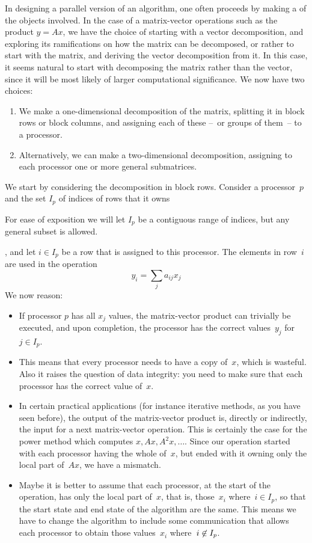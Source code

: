 In designing a parallel version of an algorithm, one often proceeds by
making a  of the objects involved. In
the case of a matrix-vector operations such as the product $y=Ax$, we
have the choice of starting with a vector decomposition, and exploring
its ramifications on how the matrix can be decomposed, or rather to
start with the matrix, and deriving the vector decomposition from it.
In this case, it seems natural to start with decomposing the matrix
rather than the vector, since it will be most likely of larger
computational significance. We now have two choices:
\begin{enumerate}
\item We make a one-dimensional decomposition of the matrix, splitting
  it in block rows or block columns, and assigning each of these --~or
  groups of them~-- to a processor.
\item Alternatively, we can make a two-dimensional decomposition,
  assigning to each processor one or more general submatrices.
\end{enumerate}

We start by considering the decomposition in block rows. Consider
a processor~$p$ and the set $I_p$ of indices of rows that it
owns
\begin{footnoteenv}
  {For ease of exposition we will let $I_p$ be a contiguous
    range of indices, but any general subset is allowed.}
\end{footnoteenv}%
, and
let $i\in I_p$ be a row that is assigned to this processor. 
The elements in
row~$i$ are used in the operation
\[ y_i=\sum_ja_{ij}x_j \]
We now reason:
\begin{itemize}
\item If processor $p$ has all $x_j$ values, the matrix-vector product
  can trivially be executed, and upon completion, the processor has
  the correct values~$y_j$ for~$j\in I_p$.
\item This means that every processor needs to have a copy of~$x$,
  which is wasteful. Also it raises the question of data integrity:
  you need to make sure that each processor has the correct value
  of~$x$.
\item In certain practical applications (for instance iterative
  methods, as you have seen before), the output of the matrix-vector
  product is, directly or indirectly, the input for a next
  matrix-vector operation. This is certainly the case for the power
  method which computes $x, Ax, A^2x,\ldots$. Since our operation
  started with each processor having the whole of~$x$, but ended with
  it owning only the local part of~$Ax$, we have a mismatch.
\item Maybe it is better to assume that each processor, at the start
  of the operation, has only the local part of~$x$, that is,
  those~$x_i$ where~$i\in I_p$, so that the start state and end state
  of the algorithm are the same. This means we have to change the
  algorithm to include some communication that allows each processor
  to obtain those values~$x_i$ where~$i\not\in\nobreak I_p$.
\end{itemize}

